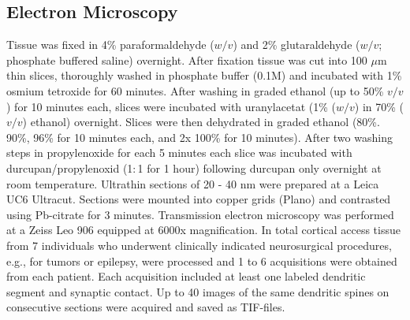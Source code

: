 \documentclass[fleqn,10pt]{wlscirep}
\begin{document}
\subsection*{Electron Microscopy}
Tissue was fixed in 4\% paraformaldehyde ($w/v$) and 2\% glutaraldehyde ($w/v$; phosphate buffered saline) overnight. After fixation tissue was cut into 100 $\mu$m thin slices, thoroughly washed in phosphate buffer (0.1M) and incubated with 1\% osmium tetroxide for 60 minutes. After washing in graded ethanol (up to 50\% $v/v$) for 10 minutes each, slices were incubated with uranylacetat (1\% ($w/v$) in 70\% ($v/v$) ethanol) overnight. Slices were then dehydrated in graded ethanol (80\%. 90\%, 96\% for 10 minutes each, and 2x 100\% for 10 minutes). After two washing steps in propylenoxide for each 5 minutes each slice was incubated with durcupan/propylenoxid (1$:$1 for 1 hour) following durcupan only overnight at room temperature. Ultrathin sections of 20 - 40 nm were prepared at a Leica UC6 Ultracut. Sections were mounted into copper grids (Plano) and contrasted using Pb-citrate for 3 minutes. Transmission electron microscopy was performed at a Zeiss Leo 906 equipped at 6000x magnification. In total cortical access tissue from 7 individuals who underwent clinically indicated neurosurgical procedures, e.g., for tumors or epilepsy, were processed and 1 to 6 acquisitions were obtained from each patient. Each acquisition included at least one labeled dendritic segment and synaptic contact. Up to 40 images of the same dendritic spines on consecutive sections were acquired and saved as TIF-files. 
\end{document}
